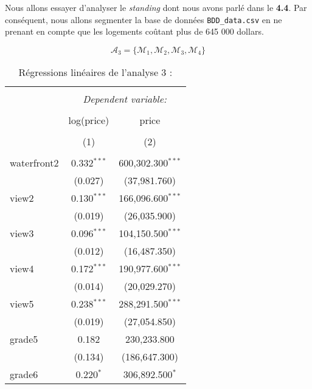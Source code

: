 \documentclass[
  11pt,
  french,
]{article}
\newenvironment{Shaded}{\begin{snugshade}}{\end{snugshade}}
\newcommand{\DecValTok}[1]{\textcolor[rgb]{0.00,0.00,0.81}{#1}}
\newcommand{\NormalTok}[1]{#1}
\newcommand{\OperatorTok}[1]{\textcolor[rgb]{0.81,0.36,0.00}{\textbf{#1}}}
\newcommand{\StringTok}[1]{\textcolor[rgb]{0.31,0.60,0.02}{#1}}
\begin{document}
Nous allons essayer d'analyser le \textit{standing} dont nous avons
parlé dans le \textbf{4.4}. Par conséquent, nous allons segmenter la
base de données \texttt{BDD\_data.csv} en ne prenant en compte que les
logements coûtant plus de 645 000 dollars.

\begin{Shaded}
\end{Shaded}

\[\mathcal{A}_{3}=\{\mathcal{M}_{1},\mathcal{M}_{2},\mathcal{M}_{3},\mathcal{M}_{4}\}\]

\begin{table}[!htbp] \centering 
  \caption{Régressions linéaires de l'analyse 3 :} 
  \label{} 
\small 
\begin{tabular}{@{\extracolsep{1pt}}lcc} 
\\[-1.8ex]\hline 
\hline \\[-1.8ex] 
 & \multicolumn{2}{c}{\textit{Dependent variable:}} \\ 
\cline{2-3} 
\\[-1.8ex] & log(price) & price \\ 
\\[-1.8ex] & (1) & (2)\\ 
\hline \\[-1.8ex] 
 waterfront2 & 0.332$^{***}$ & 600,302.300$^{***}$ \\ 
  & (0.027) & (37,981.760) \\ 
  view2 & 0.130$^{***}$ & 166,096.600$^{***}$ \\ 
  & (0.019) & (26,035.900) \\ 
  view3 & 0.096$^{***}$ & 104,150.500$^{***}$ \\ 
  & (0.012) & (16,487.350) \\ 
  view4 & 0.172$^{***}$ & 190,977.600$^{***}$ \\ 
  & (0.014) & (20,029.270) \\ 
  view5 & 0.238$^{***}$ & 288,291.500$^{***}$ \\ 
  & (0.019) & (27,054.850) \\ 
  grade5 & 0.182 & 230,233.800 \\ 
  & (0.134) & (186,647.300) \\ 
  grade6 & 0.220$^{*}$ & 306,892.500$^{*}$ \\ 

\end{tabular}
\end{table}
\end{document}
